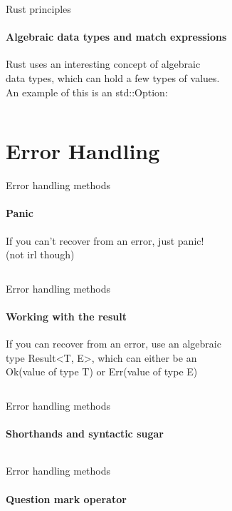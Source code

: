 \documentclass[usenames,dvipsnames,10pt,aspectratio=169]{beamer}
\begin{document}
\begin{frame}{Rust principles}
\framesubtitle{Algebraic data types and match expressions}
\footnotesize
Rust uses an interesting concept of algebraic \\
data types, which can hold a few types of values.\\ 
An example of this is an \textcolor{ucuyellow}{std::Option}:\\
\vspace{0.2cm}
\inputminted[fontsize=\normalsize]{rust}{code/option.rs}
\vspace{0.4cm}
\end{frame}


\section{Error Handling}

\begin{frame}{Error handling methods}
	\framesubtitle{Panic}
\large
If you can't recover from an error, just \textcolor{ucuyellow}{panic!}\\
(not irl though)
\vspace{0.9cm}
\inputminted[fontsize=\large]{rust}{code/error1.rs}
\normalsize
\end{frame}

\begin{frame}{Error handling methods}
\framesubtitle{Working with the result}

\normalsize
If you can recover from an error, use an algebraic\\
type \textcolor{ucuyellow}{Result<T, E>}, which can either be an\\
\textcolor{ucuyellow}{Ok(value of type T)} or \textcolor{ucuyellow}{Err(value of type E)}
\vspace{0.2cm}
\inputminted[fontsize=\normalsize]{rust}{code/error2.rs}
\vspace{0.55cm}
\end{frame}

\begin{frame}{Error handling methods}
\framesubtitle{Shorthands and syntactic sugar}

\normalsize
\inputminted[fontsize=\large]{rust}{code/error3.rs}
\end{frame}

\begin{frame}{Error handling methods}
\framesubtitle{Question mark operator}

\inputminted[fontsize=\normalsize]{rust}{code/error4.rs}
\vspace{0.5cm}
\inputminted[fontsize=\normalsize]{rust}{code/error5.rs}
\end{frame}
\end{document}
